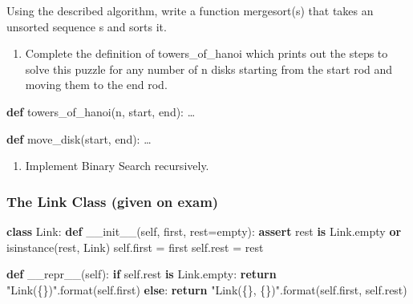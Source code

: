\documentclass[11pt]{article}
\providecommand{\tightlist}{%
      \setlength{\itemsep}{0pt}\setlength{\parskip}{0pt}}
\newenvironment{Shaded}{}{}
\newcommand{\KeywordTok}[1]{\textcolor[rgb]{0.00,0.44,0.13}{\textbf{{#1}}}}
\newcommand{\StringTok}[1]{\textcolor[rgb]{0.25,0.44,0.63}{{#1}}}
\newcommand{\FunctionTok}[1]{\textcolor[rgb]{0.02,0.16,0.49}{{#1}}}
\newcommand{\NormalTok}[1]{{#1}}
\newcommand{\SpecialCharTok}[1]{\textcolor[rgb]{0.25,0.44,0.63}{{#1}}}
\newcommand{\VariableTok}[1]{\textcolor[rgb]{0.10,0.09,0.49}{{#1}}}
\newcommand{\ControlFlowTok}[1]{\textcolor[rgb]{0.00,0.44,0.13}{\textbf{{#1}}}}
\newcommand{\OperatorTok}[1]{\textcolor[rgb]{0.40,0.40,0.40}{{#1}}}
\newcommand{\BuiltInTok}[1]{{#1}}
\begin{document}
Using the described algorithm, write a function mergesort(s) that takes
an unsorted sequence s and sorts it.

\begin{enumerate}
\def\labelenumi{\arabic{enumi}.}
\setcounter{enumi}{5}
\tightlist
\item
  Complete the definition of towers\_of\_hanoi which prints out the
  steps to solve this puzzle for any number of n disks starting from the
  start rod and moving them to the end rod.
\end{enumerate}

\begin{Shaded}
\begin{Highlighting}[]
\KeywordTok{def}\NormalTok{ towers_of_hanoi(n, start, end):}
\NormalTok{    …}

\KeywordTok{def}\NormalTok{ move_disk(start, end):}
\NormalTok{    …}
\end{Highlighting}
\end{Shaded}

\begin{enumerate}
\def\labelenumi{\arabic{enumi}.}
\setcounter{enumi}{6}
\tightlist
\item
  Implement Binary Search recursively.
\end{enumerate}

    \subsubsection{The Link Class (given on
exam)}\label{the-link-class-given-on-exam}

\begin{Shaded}
\begin{Highlighting}[]
\KeywordTok{class}\NormalTok{ Link: }
    \KeywordTok{def} \FunctionTok{__init__}\NormalTok{(}\VariableTok{self}\NormalTok{, first, rest}\OperatorTok{=}\NormalTok{empty):}
        \ControlFlowTok{assert}\NormalTok{ rest }\KeywordTok{is}\NormalTok{ Link.empty }\KeywordTok{or} \BuiltInTok{isinstance}\NormalTok{(rest, Link) }
        \VariableTok{self}\NormalTok{.first }\OperatorTok{=}\NormalTok{ first}
        \VariableTok{self}\NormalTok{.rest }\OperatorTok{=}\NormalTok{ rest}
    
\KeywordTok{def} \FunctionTok{__repr__}\NormalTok{(}\VariableTok{self}\NormalTok{):}
    \ControlFlowTok{if} \VariableTok{self}\NormalTok{.rest }\KeywordTok{is}\NormalTok{ Link.empty:             }
        \ControlFlowTok{return} \StringTok{"Link(}\SpecialCharTok{\{\}}\StringTok{)"}\NormalTok{.}\BuiltInTok{format}\NormalTok{(}\VariableTok{self}\NormalTok{.first)                }
    \ControlFlowTok{else}\NormalTok{:                   }
        \ControlFlowTok{return} \StringTok{"Link(}\SpecialCharTok{\{\}}\StringTok{, }\SpecialCharTok{\{\}}\StringTok{)"}\NormalTok{.}\BuiltInTok{format}\NormalTok{(}\VariableTok{self}\NormalTok{.first, }\VariableTok{self}\NormalTok{.rest)}
\end{Highlighting}
\end{Shaded}
\end{document}
